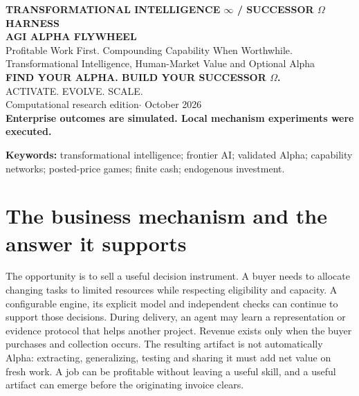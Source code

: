 \documentclass[11pt,letterpaper]{article}
\begin{document}
\thispagestyle{plain}
\begin{center}
{\small\color{accent}\bfseries TRANSFORMATIONAL INTELLIGENCE $\infty$ \quad / \quad SUCCESSOR $\Omega$ HARNESS}\\[14pt]
{\Huge\bfseries\color{ink} AGI ALPHA FLYWHEEL}\\[9pt]
{\LARGE Profitable Work First. Compounding Capability When Worthwhile.}\\[10pt]
{\large Transformational Intelligence, Human-Market Value and Optional Alpha}\\[9pt]
{\small\bfseries FIND YOUR ALPHA. BUILD YOUR SUCCESSOR $\Omega$.}\\[5pt]
{\small ACTIVATE. EVOLVE. SCALE.}\\[12pt]
Computational research edition\quad$\cdot$ October 2026\\[5pt]
\textbf{Enterprise outcomes are simulated. Local mechanism experiments were executed.}
\end{center}
\begin{abstract}
Expert current frontier AI may already provide a commercially valuable operating core. We study automated delivery of complete configurable optimization engines for bounded digital operations, using equivalent human-team service as the commercial reference. Competent frontier models, ordinary tools and existing local artifacts form \emph{Beta}. Profitability requires useful accepted work, customer choice, actual modeled collections and complete costs, including failures, automated validation, business overhead, discovery and reserves. Additional retained \emph{Alpha}, network sharing and further investment are optional enhancements, tested separately under matched conditions. Source-job learning is charged once in A; only extra retention and reuse enters B, and separate research enters C. Published tariffs and service rates anchor monetary units; effort, task reliability and buyer response remain explicit assumptions. 
\end{abstract}
\textbf{Keywords:} transformational intelligence; frontier AI; validated Alpha; capability networks; posted-price games; finite cash; endogenous investment.

\section{The business mechanism and the answer it supports}


The opportunity is to sell a useful decision instrument. A buyer needs to allocate changing tasks to limited resources while respecting eligibility and capacity. A configurable engine, its explicit model and independent checks can continue to support those decisions. During delivery, an agent may learn a representation or evidence protocol that helps another project. Revenue exists only when the buyer purchases and collection occurs. The resulting artifact is not automatically Alpha: extracting, generalizing, testing and sharing it must add net value on fresh work. A job can be profitable without leaving a useful skill, and a useful artifact can emerge before the originating invoice clears.
\end{document}
